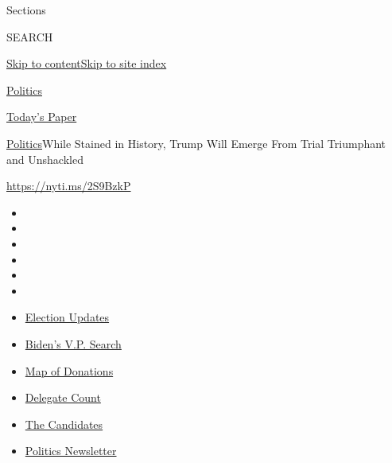 Sections

SEARCH

\protect\hyperlink{site-content}{Skip to
content}\protect\hyperlink{site-index}{Skip to site index}

\href{https://www.nytimes.com/section/politics}{Politics}

\href{https://myaccount.nytimes.com/auth/login?response_type=cookie\&client_id=vi}{}

\href{https://www.nytimes.com/section/todayspaper}{Today's Paper}

\href{/section/politics}{Politics}\textbar{}While Stained in History,
Trump Will Emerge From Trial Triumphant and Unshackled

\url{https://nyti.ms/2S9BzkP}

\begin{itemize}
\item
\item
\item
\item
\item
\item
\end{itemize}

\begin{itemize}
\item
  \href{https://www.nytimes.com/2020/07/31/us/elections/biden-vs-trump.html?action=click\&pgtype=Article\&state=default\&region=TOP_BANNER\&context=storylines_menu}{Election
  Updates}
\item
  \href{https://www.nytimes.com/article/biden-vice-president-2020.html?action=click\&pgtype=Article\&state=default\&region=TOP_BANNER\&context=storylines_menu}{Biden's
  V.P. Search}
\item
  \href{https://www.nytimes.com/interactive/2020/07/24/us/politics/trump-biden-campaign-donors.html?action=click\&pgtype=Article\&state=default\&region=TOP_BANNER\&context=storylines_menu}{Map
  of Donations}
\item
  \href{https://www.nytimes.com/interactive/2020/us/elections/delegate-count-primary-results.html?action=click\&pgtype=Article\&state=default\&region=TOP_BANNER\&context=storylines_menu}{Delegate
  Count}
\item
  \href{https://www.nytimes.com/interactive/2019/us/politics/2020-presidential-candidates.html?action=click\&pgtype=Article\&state=default\&region=TOP_BANNER\&context=storylines_menu}{The
  Candidates}
\item
  \href{https://www.nytimes.com/newsletters/politics?action=click\&pgtype=Article\&state=default\&region=TOP_BANNER\&context=storylines_menu}{Politics
  Newsletter}
\end{itemize}

